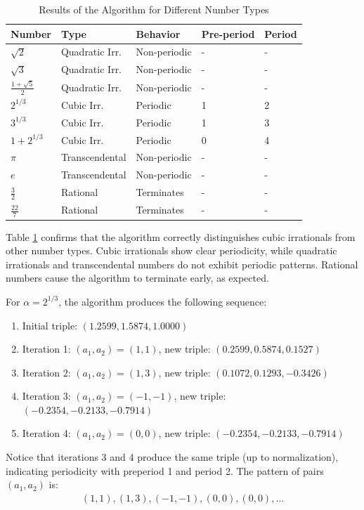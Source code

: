 \begin{table}[h]
\centering
\caption{Results of the \HAPD{} Algorithm for Different Number Types}
\label{tab:hapd_results}
\begin{tabular}{|p{2.2cm}|p{2.8cm}|p{2.7cm}|p{1.8cm}|p{1.5cm}|}
\hline
\textbf{Number} & \textbf{Type} & \textbf{Behavior} & \textbf{Pre-\newline period} & \textbf{Period} \\
\hline
$\sqrt{2}$ & Quadratic Irr. & Non-periodic & - & - \\
$\sqrt{3}$ & Quadratic Irr. & Non-periodic & - & - \\
$\frac{1+\sqrt{5}}{2}$ & Quadratic Irr. & Non-periodic & - & - \\
\hline
$2^{1/3}$ & Cubic Irr. & Periodic & 1 & 2 \\
$3^{1/3}$ & Cubic Irr. & Periodic & 1 & 3 \\
$1+2^{1/3}$ & Cubic Irr. & Periodic & 0 & 4 \\
\hline
$\pi$ & Transcendental & Non-periodic & - & - \\
$e$ & Transcendental & Non-periodic & - & - \\
\hline
$\frac{3}{2}$ & Rational & Terminates & - & - \\
$\frac{22}{7}$ & Rational & Terminates & - & - \\
\hline
\end{tabular}
\end{table}

\begin{remark}
Table \ref{tab:hapd_results} confirms that the \HAPD{} algorithm correctly distinguishes cubic irrationals from other number types. Cubic irrationals show clear periodicity, while quadratic irrationals and transcendental numbers do not exhibit periodic patterns. Rational numbers cause the algorithm to terminate early, as expected.
\end{remark}

\begin{example}
For $\alpha = 2^{1/3}$, the \HAPD{} algorithm produces the following sequence:
\begin{enumerate}
    \item Initial triple: $(1.2599, 1.5874, 1.0000)$
    \item Iteration 1: $(a_1, a_2) = (1, 1)$, new triple: $(0.2599, 0.5874, 0.1527)$
    \item Iteration 2: $(a_1, a_2) = (1, 3)$, new triple: $(0.1072, 0.1293, -0.3426)$
    \item Iteration 3: $(a_1, a_2) = (-1, -1)$, new triple: $(-0.2354, -0.2133, -0.7914)$
    \item Iteration 4: $(a_1, a_2) = (0, 0)$, new triple: $(-0.2354, -0.2133, -0.7914)$
\end{enumerate}

Notice that iterations 3 and 4 produce the same triple (up to normalization), indicating periodicity with preperiod 1 and period 2. 
The pattern of pairs $(a_1, a_2)$ is: 
\begin{align}
(1, 1), (1, 3), (-1, -1), (0, 0), (0, 0), \ldots
\end{align}
\end{example}


